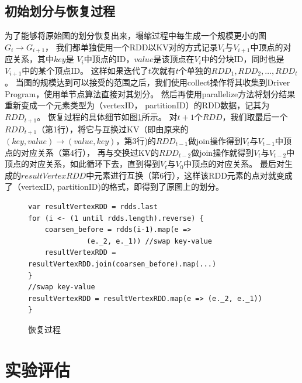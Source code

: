 \documentclass[master]{njuthesis}
\begin{document}
\subsection{初始划分与恢复过程}
为了能够将原始图的划分恢复出来，塌缩过程中每生成一个规模更小的图$G_i \rightarrow G_{i+1}$，
我们都单独使用一个RDD以KV对的方式记录$V_i$与$V_{i+1}$中顶点的对应关系，其中$key$是
$V_i$中顶点的ID，$value$是该顶点在$V_i$中的分块ID，同时也是$V_{i+1}$中的某个顶点ID。
这样如果迭代了$t$次就有$t$个单独的$RDD_{1}, RDD_{2}, \dots, RDD_{t}$。
当图的规模达到可以接受的范围之后，我们使用collect操作将其收集到Driver Program，使用单节点算法直接对其划分。
然后再使用parallelize方法将划分结果重新变成一个元素类型为（vertexID， partitionID）的RDD数据，记其为$RDD_{t+1}$。
恢复过程的具体细节如图\ref{fig:restore}所示。
对$t+1$个$RDD$，我们取最后一个$RDD_{t+1}$（第1行），将它与互换过KV（即由原来的$(key,value) \rightarrow (value, key)$，第3行)的$RDD_{t-1}$做join操作得到$V_t$与$V_{t-1}$中顶点的对应关系（第4行），
再与交换过KV的$RDD_{t-2}$做join操作就得到$V_t$与$V_{t-2}$中顶点的对应关系，如此循环下去，直到得到$V_t$与$V_0$中顶点的对应关系。
最后对生成的$resultVertexRDD$中元素进行互换（第6行），这样该RDD元素的点对就变成了（vertexID, partitionID)的格式，即得到了原图上的划分。
\begin{figure}[h]
  \centering
\begin{lstlisting}
var resultVertexRDD = rdds.last
for (i <- (1 until rdds.length).reverse) {
    coarsen_before = rdds(i-1).map(e => 
			  (e._2, e._1)) //swap key-value
    resultVertexRDD = resultVertexRDD.join(coarsen_before).map(...) 
}
//swap key-value
resultVertexRDD = resultVertexRDD.map(e => (e._2, e._1)) 
}
\end{lstlisting}
\caption{恢复过程}
   \label{fig:restore}
\end{figure}
\section{实验评估}
\end{document}
